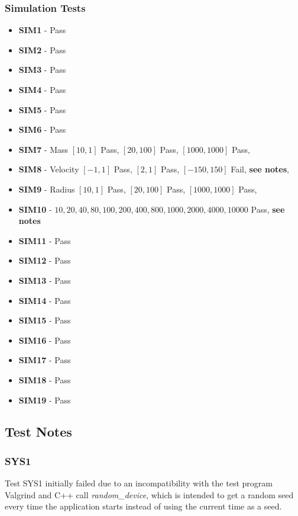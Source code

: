 \subsubsection{Simulation Tests}
\begin{itemize}
\footnotesize
\item \textbf{SIM1} - {\color{Green}Pass}
\item \textbf{SIM2} - {\color{Green}Pass}
\item \textbf{SIM3} - {\color{Green}Pass}
\item \textbf{SIM4} - {\color{Green}Pass}
\item \textbf{SIM5} - {\color{Green}Pass}
\item \textbf{SIM6} - {\color{Green}Pass}
\item \textbf{SIM7} - Mass $[10,1]$ {\color{Green}Pass}, $[20,100]$ {\color{Green}Pass}, $[1000,1000]$ {\color{Green}Pass},
\item \textbf{SIM8} - Velocity $[-1,1]$ {\color{Green}Pass}, $[2,1]$ {\color{Green}Pass}, $[-150,150]$ {\color{Red}Fail}, \textbf{see notes},
\item \textbf{SIM9} - Radius $[10,1]$ {\color{Green}Pass}, $[20,100]$ {\color{Green}Pass}, $[1000,1000]$ {\color{Green}Pass},
\item \textbf{SIM10} - $10, 20, 40, 80, 100, 200, 400, 800, 1000, 2000, 4000, 10000$ {\color{Green}Pass}, \textbf{see notes}
\item \textbf{SIM11} - {\color{Green}Pass}
\item \textbf{SIM12} - {\color{Green}Pass}
\item \textbf{SIM13} - {\color{Green}Pass}
\item \textbf{SIM14} - {\color{Green}Pass}
\item \textbf{SIM15} - {\color{Green}Pass}
\item \textbf{SIM16} - {\color{Green}Pass}
\item \textbf{SIM17} - {\color{Green}Pass}
\item \textbf{SIM18} - {\color{Green}Pass}
\item \textbf{SIM19} - {\color{Green}Pass}
\end{itemize}

\subsection{Test Notes}
\subsubsection{SYS1}
Test SYS1 initially failed due to an incompatibility with the test program Valgrind and C++ call \textit{random\_device}, which is intended to get a random seed every time the application starts instead of using the current time as a seed.
